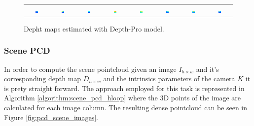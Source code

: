 \begin{figure}[h]
\begin{tabular}{c c c c c c c c}
        \includegraphics[width=0.12\textwidth]{images/metodology/depth_images/colored_depth_map_0.png} & 
        \includegraphics[width=0.12\textwidth]{images/metodology/depth_images/colored_depth_map_1.png} & 
        \includegraphics[width=0.12\textwidth]{images/metodology/depth_images/colored_depth_map_2.png} &
        \includegraphics[width=0.12\textwidth]{images/metodology/depth_images/colored_depth_map_3.png} &
        \includegraphics[width=0.12\textwidth]{images/metodology/depth_images/colored_depth_map_4.png} &   
        \includegraphics[width=0.12\textwidth]{images/metodology/depth_images/colored_depth_map_5.png} & 
        \includegraphics[width=0.12\textwidth]{images/metodology/depth_images/colored_depth_map_6.png} &
        \includegraphics[width=0.12\textwidth]{images/metodology/depth_images/colored_depth_map_7.png} \\
    \end{tabular}    
    \caption{Depht maps estimated with Depth-Pro model.}
    \label{fig:depth_images}
\end{figure}

\subsubsection{Scene PCD}
In order to compute the scene pointcloud given an image $I_{h \times w}$ and it's corresponding depth map $D_{h \times w}$ and the intrinsics parameters of the camera $K$ it is prety straight forward. The approach employed for this task is represented in Algorithm \ref{algorithm:scene_pcd_hloop} where the 3D points of the image are calculated for each image column. The resulting dense pointcloud can be seen in Figure \ref{fig:pcd_scene_images}.

